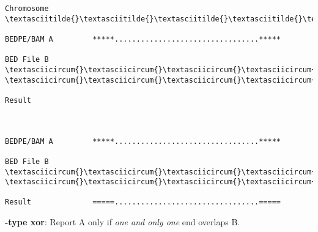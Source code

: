 \documentclass[letterpaper,10pt,english]{sphinxmanual}
\begin{document}
\begin{Verbatim}[commandchars=\\\{\}]
Chromosome  \textasciitilde{}\textasciitilde{}\textasciitilde{}\textasciitilde{}\textasciitilde{}\textasciitilde{}\textasciitilde{}\textasciitilde{}\textasciitilde{}\textasciitilde{}\textasciitilde{}\textasciitilde{}\textasciitilde{}\textasciitilde{}\textasciitilde{}\textasciitilde{}\textasciitilde{}\textasciitilde{}\textasciitilde{}\textasciitilde{}\textasciitilde{}\textasciitilde{}\textasciitilde{}\textasciitilde{}\textasciitilde{}\textasciitilde{}\textasciitilde{}\textasciitilde{}\textasciitilde{}\textasciitilde{}\textasciitilde{}\textasciitilde{}\textasciitilde{}\textasciitilde{}\textasciitilde{}\textasciitilde{}\textasciitilde{}\textasciitilde{}\textasciitilde{}\textasciitilde{}\textasciitilde{}\textasciitilde{}\textasciitilde{}\textasciitilde{}\textasciitilde{}\textasciitilde{}\textasciitilde{}\textasciitilde{}\textasciitilde{}\textasciitilde{}\textasciitilde{}\textasciitilde{}\textasciitilde{}\textasciitilde{}\textasciitilde{}\textasciitilde{}\textasciitilde{}\textasciitilde{}\textasciitilde{}\textasciitilde{}\textasciitilde{}\textasciitilde{}\textasciitilde{}\textasciitilde{}

BEDPE/BAM A         *****.................................*****

BED File B         \textasciicircum{}\textasciicircum{}\textasciicircum{}\textasciicircum{}\textasciicircum{}\textasciicircum{}\textasciicircum{}\textasciicircum{}                                          \textasciicircum{}\textasciicircum{}\textasciicircum{}\textasciicircum{}\textasciicircum{}\textasciicircum{}

Result



BEDPE/BAM A         *****.................................*****

BED File B   \textasciicircum{}\textasciicircum{}\textasciicircum{}\textasciicircum{}                                                  \textasciicircum{}\textasciicircum{}\textasciicircum{}\textasciicircum{}\textasciicircum{}\textasciicircum{}

Result              =====.................................=====
\end{Verbatim}

\textbf{-type xor}: Report A only if \emph{one and only one} end overlaps B.
\end{document}
